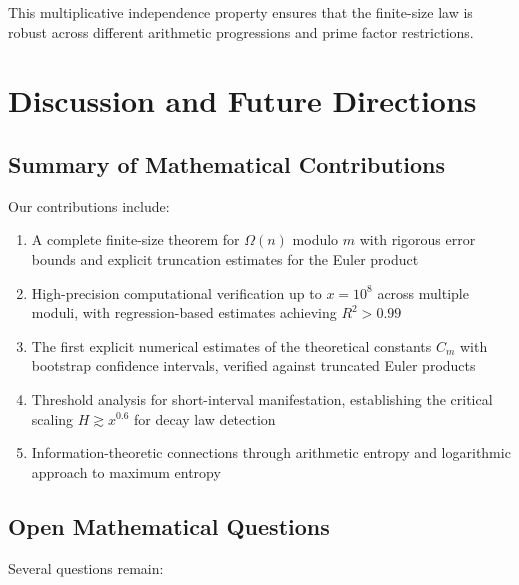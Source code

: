 \documentclass[12pt]{article}
\theoremstyle{definition}
\theoremstyle{remark}
\begin{document}
This multiplicative independence property ensures that the finite-size law is robust across different arithmetic progressions and prime factor restrictions.

\section{Discussion and Future Directions}

\subsection{Summary of Mathematical Contributions}

Our contributions include:
\begin{enumerate}
\item A complete finite-size theorem for $\Omega(n)$ modulo $m$ with rigorous error bounds and explicit truncation estimates for the Euler product
\item High-precision computational verification up to $x = 10^8$ across multiple moduli, with regression-based estimates achieving $R^2 > 0.99$
\item The first explicit numerical estimates of the theoretical constants $C_m$ with bootstrap confidence intervals, verified against truncated Euler products
\item Threshold analysis for short-interval manifestation, establishing the critical scaling $H \gtrsim x^{0.6}$ for decay law detection
\item Information-theoretic connections through arithmetic entropy and logarithmic approach to maximum entropy
\end{enumerate}

\subsection{Open Mathematical Questions}

Several questions remain:
\end{document}
